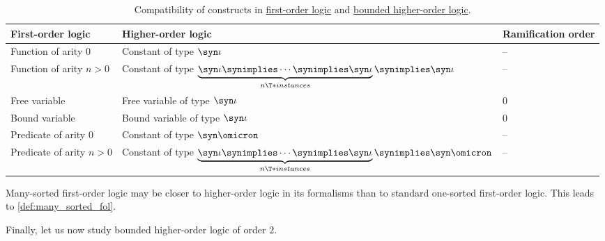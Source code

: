 \begin{example}
\begin{thmenum}
    \begin{table}
      \begin{center}
        \begin{tabular}{l l l}
          \toprule
          First-order logic              & Higher-order logic                                                                                                                 & Ramification order \\
          \midrule
          Function of arity \( 0 \)      & Constant of type \( \syn\iota \)                                                                                                   & --      \\
          Function of arity \( n > 0 \)  & Constant of type \( \underbrace{\syn\iota \synimplies \cdots \synimplies \syn\iota}_{n \T*{instances}} \synimplies \syn\iota \)    & --      \\
          Free variable                  & Free variable of type \( \syn\iota \)                                                                                              & \( 0 \) \\
          Bound variable                 & Bound variable of type \( \syn\iota \)                                                                                             & \( 0 \) \\
          Predicate of arity \( 0 \)     & Constant of type \( \syn\omicron \)                                                                                                & --      \\
          Predicate of arity \( n > 0 \) & Constant of type \( \underbrace{\syn\iota \synimplies \cdots \synimplies \syn\iota}_{n \T*{instances}} \synimplies \syn\omicron \) & --      \\
          \bottomrule
        \end{tabular}
      \end{center}

      \caption{Compatibility of constructs in \hyperref[def:first_order_logic]{first-order logic} and \hyperref[def:bounded_hol]{bounded higher-order logic}.}\label{tab:ex:def:bounded_hol/first}
    \end{table}

    Many-sorted first-order logic may be closer to higher-order logic in its formalisms than to standard one-sorted first-order logic. This leads to \cref{def:many_sorted_fol}.

     Finally, let us now study bounded higher-order logic of order \( 2 \).


\end{thmenum}
\end{example}
